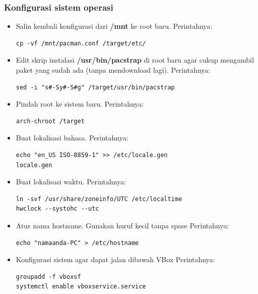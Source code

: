 \documentclass[12pt,]{article}
\begin{document}
	\subsubsection{Konfigurasi sistem operasi}
	\begin{itemize}
		\item Salin kembali konfigurasi dari \textbf{/mnt} ke root baru.
		Perintahnya:
		\begin{verbatim}
cp -vf /mnt/pacman.conf /target/etc/	
		\end{verbatim}	
		
		\item Edit skrip instalasi \textbf{/usr/bin/pacstrap} di root baru agar cukup mengambil paket yang sudah ada (tanpa mendownload lagi).
		Perintahnya:
		\begin{verbatim}
sed -i "s#-Sy#-S#g" /target/usr/bin/pacstrap	
		\end{verbatim}
		
		\item Pindah root ke sistem baru.
		Perintahnya:
		\begin{verbatim}
arch-chroot /target
		\end{verbatim}
		
		\item Buat lokalisasi bahasa.
		Perintahnya:
		\begin{verbatim}
echo "en_US ISO-8859-1" >> /etc/locale.gen
locale.gen
		\end{verbatim}
		
		\item Buat lokalisasi waktu.
		Perintahnya:
		\begin{verbatim}
ln -svf /usr/share/zoneinfo/UTC /etc/localtime
hwclock --systohc --utc
		\end{verbatim}
		
		\item Atur nama hostname. Gunakan huruf kecil tanpa spase
		Perintahnya:
		\begin{verbatim}
echo "namaanda-PC" > /etc/hostname
		\end{verbatim}
		
		\item Konfigurasi sistem agar dapat jalan dibawah VBox
		Perintahnya:
		\begin{verbatim}
groupadd -f vboxsf
systemctl enable vboxservice.service
		\end{verbatim}
		

\end{itemize}
\end{document}
